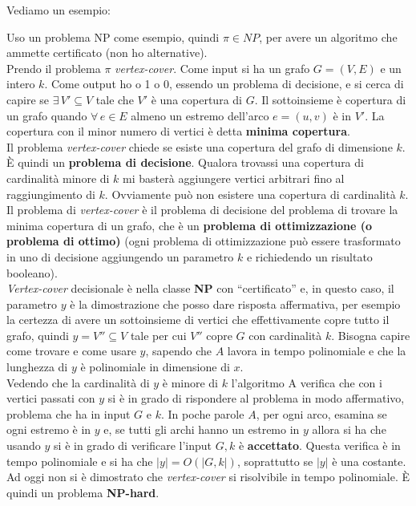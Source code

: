 \documentclass[a4paper,12pt, oneside]{book}
\begin{document}
Vediamo un esempio:
\begin{esempio}
  Uso un problema NP come esempio, quindi $\pi\in NP$, per avere un algoritmo
  che ammette certificato (non ho alternative). \\
  Prendo il problema $\pi$ \emph{vertex-cover}. Come input si ha un grafo
  $G=(V,E)$ e un intero $k$. Come output ho o 1 o 0, essendo un problema di
  decisione, e si cerca di capire se $\exists\, V'\subseteq V$ tale che $V'$ è
  una copertura di $G$. Il sottoinsieme è copertura di un grafo quando
  $\forall\, e\in E$ almeno un estremo dell'arco $e=(u,v)$ è in $V'$. La
  copertura con il minor numero di vertici è detta \textbf{minima copertura}.\\
  Il problema \emph{vertex-cover} chiede se esiste una copertura del grafo di
  dimensione $k$. È quindi un \textbf{problema di decisione}. Qualora trovassi
  una copertura di cardinalità minore di $k$ mi basterà aggiungere vertici
  arbitrari fino al raggiungimento di $k$. Ovviamente può non esistere una
  copertura di cardinalità $k$.\\
  Il problema di \emph{vertex-cover} è il problema di decisione del problema di
  trovare la minima copertura di un grafo, che è un \textbf{problema di
    ottimizzazione (o problema di ottimo)} (ogni problema di ottimizzazione può
  essere trasformato in uno di decisione aggiungendo un parametro $k$ e
  richiedendo un risultato booleano).\\
  \emph{Vertex-cover} decisionale è nella classe \textbf{NP} con ``certificato''
  e, in questo caso, il parametro $y$ è la dimostrazione che posso dare risposta
  affermativa, per esempio la certezza di avere un sottoinsieme di vertici che
  effettivamente copre tutto il grafo, quindi $y=V''\subseteq V$ tale per cui
  $V''$ copre $G$ con cardinalità $k$. Bisogna capire come trovare e come usare
  $y$, sapendo che $A$ lavora in tempo polinomiale e che la lunghezza di $y$ è
  polinomiale in dimensione di $x$.\\ 
  Vedendo che la cardinalità di $y$ è minore di $k$ l'algoritmo A verifica che
  con i vertici passati con $y$ si è in grado di rispondere al problema in modo
  affermativo, problema che ha in input $G$ e $k$. In poche parole $A$, per ogni
  arco, esamina se ogni estremo è in $y$ e, se tutti gli archi hanno un estremo
  in $y$ allora si ha che usando $y$ si è in grado di verificare l'input $G,
  k$ è \textbf{accettato}. Questa verifica è in tempo polinomiale e si ha che
  $|y|=O(|G,k|)$, soprattutto se $|y|$ è una costante.\\
  Ad oggi non si è dimostrato che \emph{vertex-cover} si risolvibile in tempo
  polinomiale. È quindi un problema \textbf{NP-hard}.
\end{esempio}
\end{document}
